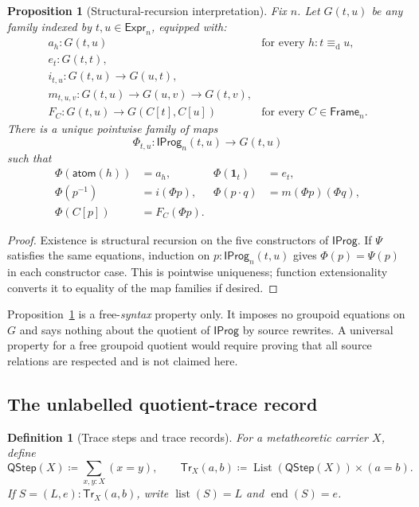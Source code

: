 \documentclass[10pt,reqno]{amsart}
\newtheorem{proposition}[theorem]{Proposition}
\newtheorem{definition}[theorem]{Definition}
\newcommand{\Expr}{\mathsf{Expr}}
\newcommand{\Tr}{\mathsf{Tr}}
\newcommand{\Frame}{\mathsf{Frame}}
\newcommand{\IProg}{\mathsf{IProg}}
\newcommand{\defeq}{\mathrel{\equiv_{\mathrm d}}}
\begin{document}
\begin{proposition}[Structural-recursion interpretation]
\label{prop:iprogram-recursion}
Fix \(n\).  Let \(G(t,u)\) be any family indexed by
\(t,u\in\Expr_n\), equipped with:
\[
\begin{array}{ll}
a_h:G(t,u)&\text{for every }h:t\defeq u,\\
e_t:G(t,t),&\\
i_{t,u}:G(t,u)\to G(u,t),&\\
m_{t,u,v}:G(t,u)\to G(u,v)\to G(t,v),&\\
F_C:G(t,u)\to G(C[t],C[u])&\text{for every }C\in\Frame_n.
\end{array}
\tag{8.3}\label{eq:target-signature}
\]
There is a unique pointwise family of maps
\[
        \Phi_{t,u}:\IProg_n(t,u)\to G(t,u)
\tag{8.4}\label{eq:iprogram-fold}
\]
such that
\[
\begin{aligned}
\Phi(\mathsf{atom}(h))&=a_h,&
\Phi(\mathbf1_t)&=e_t,\\
\Phi(p^{-1})&=i(\Phi p),&
\Phi(p\cdot q)&=m(\Phi p)(\Phi q),\\
\Phi(C[p])&=F_C(\Phi p).
\end{aligned}
\tag{8.5}\label{eq:iprogram-fold-equations}
\]
\end{proposition}

\begin{proof}
Existence is structural recursion on the five constructors of
\(\IProg\).  If \(\Psi\) satisfies the same equations, induction on
\(p:\IProg_n(t,u)\) gives \(\Phi(p)=\Psi(p)\) in each constructor case.
This is pointwise uniqueness; function extensionality converts it to equality
of the map families if desired.
\end{proof}

Proposition~\ref{prop:iprogram-recursion} is a free-\emph{syntax} property
only.  It imposes no groupoid equations on \(G\) and says nothing about the
quotient of \(\IProg\) by source rewrites.  A universal property for a free
groupoid quotient would require proving that all source relations are
respected and is not claimed here.

\subsection{The unlabelled quotient-trace record}

\begin{definition}[Trace steps and trace records]
\label{def:trace-record}
For a metatheoretic carrier \(X\), define
\[
 \mathsf{QStep}(X)\coloneqq\sum_{x,y:X}(x=y),
 \qquad
 \Tr_X(a,b)\coloneqq
   \operatorname{List}(\mathsf{QStep}(X))\times(a=b).
\tag{8.6}\label{eq:trace-record}
\]
If \(S=(L,e):\Tr_X(a,b)\), write
\(\operatorname{list}(S)=L\) and
\(\operatorname{end}(S)=e\).
\end{definition}
\end{document}
